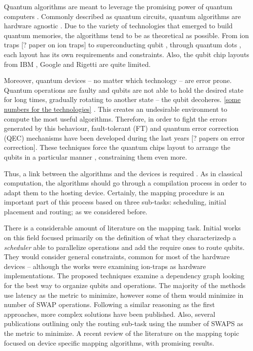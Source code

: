 \documentclass[11pt]{article}
\author{Daniel Moreno Manzano}
\date{\today}
\title{}
\begin{document}
Quantum algorithms are meant to leverage the promising power of quantum computers \cite{coles18:quant_algor_implem_begin}.
Commonly described as quantum circuits, quantum algorithms are hardware agnostic \cite{Nielsen_2009}.
Due to the variety of technologies that emerged to build quantum memories, the algorithms tend to be as theoretical as possible.
From ion traps [? paper on ion traps] to superconducting qubit \cite{Barends_2014}, through quantum dots \cite{Hill_2015,Li_2018}, each layout has its own requirements and constraints.
Also, the qubit chip layouts from IBM \cite{IBM_QX}, Google \cite{boixo16:charac_quant_suprem_near_term_devic} and Rigetti \cite{Sete_2016} are quite limited.

Moreover, quantum devices -- no matter which technology -- are error prone.
Quantum operations are faulty and qubits are not able to hold the desired state for long times, gradually rotating to another state -- the qubit decoheres.
\uline{[some numbers for the technologies]} \cite{O_Brien_2017}.
This creates an undesirable environment to compute the most useful algorithms.
Therefore, in order to fight the errors generated by this behaviour, fault-tolerant (FT) and quantum error correction (QEC) mechanisms have been developed during the last years \cite{Nielsen_2009} [? papers on error correction].
These techniques force the quantum chips layout to arrange the qubits in a particular manner \cite{Versluis_2017}, constraining them even more.

Thus, a link between the algorithms and the devices is required \cite{Fu_2016}.
As in classical computation, the algorithms should go through a compilation process in order to adapt them to the hosting device.
Certainly, the mapping procedure is an important part of this process based on three sub-tasks: scheduling, initial placement and routing; as we considered before.

There is a considerable amount of literature on the mapping task.
Initial works on this field \cite{Metodi_2006,Whitney_2007,Bahreini_2015} focused primarily on the definition of what they characterizedp a \emph{scheduler} able to parallelize operations and add the require ones to route qubits.
They would consider general constraints, common for most of the hardware devices -- although the works were examining ion-traps as hardware implementations.
The proposed techniques examine a dependency graph looking for the best way to organize qubits and operations.
The majority of the methods use latency as the metric to minimize, however some of them \cite{Farghadan_2017} would minimize in number of SWAP operations.
Following a similar reasoning as the first approaches, more complex solutions \cite{booth18:compar_integ_const_progr_tempor} have been published.
Also, several publications \cite{Lye_2015,Wille_2016} outlining only the routing sub-task using the number of SWAPS as the metric to minimize.
A recent review of the literature on the mapping topic \cite{zulehner17:effic_method_mappin_quant_circuit,Siraichi_2018,mckay18:qiskit_backen_specif_openq_openp_exper,Dueck_2018,Venturelli_2018} focused on device specific mapping algorithms, with promising results.
\end{document}
